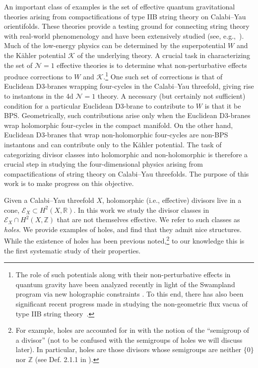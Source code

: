 \documentclass[11pt,dvipsnames]{article}
\theoremstyle{definition}
\newcommand{\cN}{\mathcal{N}}
\begin{document}
An important class of examples is the set of effective quantum gravitational theories arising from compactifications of type IIB string theory on Calabi--Yau orientifolds. These theories provide a testing ground for connecting string theory with real-world phenomenology and have been extensively studied (see, e.g.,~\cite{Cicoli:2012sz, Gendler:2023kjt, Demirtas:2021nlu, McAllister:2024lnt,Sheridan:2024vtt, Reece:2025thc,Maharana:2012tu,Marchesano:2024gul,vandeHeisteeg:2023uxj,Jain:2025vfh,Mehta:2021pwf,McAllister:2025qwq}). Much of the low-energy physics can be determined by the superpotential $W$ and the K\"ahler potential $\mathcal{K}$ of the underlying theory. A crucial task in characterizing the set of $\mathcal{N}=1$ effective theories is to determine what non-perturbative effects produce corrections to $W$ and $\mathcal{K}$.\footnote{The role of such potentials along with their non-perturbative effects in quantum gravity have been analyzed recently in light of the Swampland program via new holographic constraints \cite{Bedroya:2025fie,Bedroya:2025ltj}. To this end, there has also been significant recent progress made in studying the non-geometric flux vacua of type IIB string theory~\cite{Chen:2025rkb,Mohseni:2025tig,Becker:2022hse,Becker:2024ijy,Bardzell:2022jfh,Rajaguru:2024emw}.} One such set of corrections is that of Euclidean D3-branes wrapping four-cycles in the Calabi--Yau threefold, giving rise to instantons in the 4d $\cN=1$ theory. A necessary (but certainly not sufficient) condition for a particular Euclidean D3-brane to contribute to $W$ is that it be BPS. Geometrically, such contributions arise only when the Euclidean D3-branes wrap holomorphic four-cycles in the compact manifold. On the other hand, Euclidean D3-branes that wrap non-holomorphic four-cycles are non-BPS instantons and can contribute only to the K\"ahler potential. The task of categorizing divisor classes into holomorphic and non-holomorphic is therefore a crucial step in studying the four-dimensional physics arising from compactifications of string theory on Calabi--Yau threefolds. The purpose of this work is to make progress on this objective.

Given a Calabi--Yau threefold $X$, holomorphic (i.e., effective) divisors live in a cone, $\mathcal{E}_X \subset H^2(X, \mathbb{R})$. In this work we study the divisor classes in $\mathcal{E}_X \cap H^2(X,\mathbb{Z})$ that are not themselves effective. We refer to such classes as \textit{holes}. We provide examples of holes, and find that they admit nice structures. While the existence of holes has been previous noted,\footnote{For example, holes are accounted for in \cite{lazarsfeld2017positivity} with the notion of the ``semigroup of a divisor'' (not to be confused with the semigroups of holes we will discuss later). In particular, holes are those divisors whose semigroups are neither $\{0\}$ nor $\mathbb{Z}$ (see Def. 2.1.1 in \cite{lazarsfeld2017positivity}).} to our knowledge this is the first systematic study of their properties.
\end{document}
